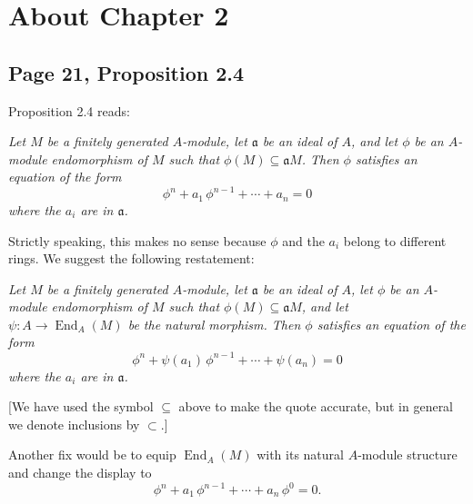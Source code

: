 \documentclass[parskip=half,fontsize=12pt]{scrartcl}%
\newcommand{\oo}{\operatorname}\newcommand{\ooo}{\operatorname*}
\newcommand{\mf}{\mathfrak}
\begin{document}
\begin{comment}
Let $x$ be in $X$ and let us show that $\widetilde\varphi(x)$ is in $Y$. Let $g$ be in $I(Y)$. It suffices to check $g(\widetilde\varphi(x))=0$. But we have 
$$
g\left(\widetilde\varphi(x)\right)=g\left(\widetilde\Phi(u_1)(x),\dots,\widetilde\Phi(u_m)(x)\right)=\widetilde\Phi(g)(x)=0.
$$ 
Thus $\widetilde\varphi$ induces a regular map $\varphi:X\to Y$. It is straightforward to verify that $\varphi$ does not depend on the choice of $\widetilde\Phi$. Set $G(\Phi):=\varphi$, that is 
$$
\widetilde{G(\Phi)}(x):=\left(\widetilde\Phi(u_1)(x),\dots,\widetilde\Phi(u_m)(x)\right).
$$ 
Finally, it is straightforward to check $G(F(\varphi))=\varphi$ and $F(G(\Phi))=\Phi$.

\end{comment}


\section{About Chapter 2}%

\subsection{Page 21, Proposition 2.4}\label{24}%

Proposition 2.4 reads:

\emph{Let $M$ be a finitely generated $A$-module, let $\mf a$ be an ideal of $A$, and let $\phi$ be an $A$-module endomorphism of $M$ such that $\phi(M)\subseteq\mf a M$. Then $\phi$ satisfies an equation of the form
$$
\phi^n+a_1\,\phi^{n-1}+\cdots+a_n=0
$$ 
where the $a_i$ are in $\mf a$.}

Strictly speaking, this makes no sense because $\phi$ and the $a_i$ belong to different rings. We suggest the following restatement:

\emph{Let $M$ be a finitely generated $A$-module, let $\mf a$ be an ideal of $A$, let $\phi$ be an $A$-module endomorphism of $M$ such that $\phi(M)\subseteq\mf a M$, and let $\psi:A\to\oo{End}_A(M)$ be the natural morphism. Then $\phi$ satisfies an equation of the form
$$
\phi^n+\psi(a_1)\,\phi^{n-1}+\cdots+\psi(a_n)=0
$$ 
where the $a_i$ are in $\mf a$.}

[We have used the symbol $\subseteq$ above to make the quote accurate, but in general we denote inclusions by $\subset$.]

Another fix would be to equip $\operatorname{End}_A(M)$ with its natural $A$-module structure and change the display to 
$$
\phi^n+a_1\,\phi^{n-1}+\cdots+a_n\,\phi^0=0.
$$
\end{document}
